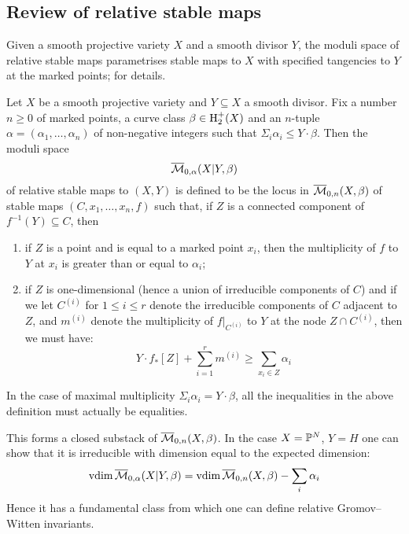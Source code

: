 \subsection{Review of relative stable maps} \label{Subsection relative stable maps} Given a smooth projective variety $X$ and a smooth divisor $Y$, the moduli space of relative stable maps parametrises stable maps to $X$ with specified tangencies to $Y$ at the marked points; \cite{Ga} for details.

\begin{definition} Let $X$ be a smooth projective variety and $Y \subseteq X$ a smooth divisor. Fix a number $n \geq 0$ of marked points, a curve class $\beta \in \operatorname{H}_2^+(X)$ and an $n$-tuple $\alpha = (\alpha_1, \ldots, \alpha_n)$ of non-negative integers such that $\Sigma_i \alpha_i \leq Y \cdot \beta$. Then the moduli space
\begin{equation*} \overline{\mathcal M}_{0,\alpha}(X|Y,\beta) \end{equation*}
of relative stable maps to $(X,Y)$ is defined to be the locus in $\overline{\mathcal M}_{0,n}(X,\beta)$ of stable maps $(C,x_1, \ldots, x_n, f)$ such that, if $Z$ is a connected component of $f^{-1}(Y) \subseteq C$, then
\begin{enumerate}
\item if $Z$ is a point and is equal to a marked point $x_i$, then the multiplicity of $f$ to $Y$ at $x_i$ is greater than or equal to $\alpha_i$;
\item if $Z$ is one-dimensional (hence a union of irreducible components of $C$) and if we let $C^{(i)}$ for $1 \leq i \leq r$ denote the irreducible components of $C$ adjacent to $Z$, and $m^{(i)}$ denote the multiplicity of $f|_{C^{(i)}}$ to $Y$ at the node $Z \cap C^{(i)}$, then we must have:
\begin{equation*} Y \cdot f_* [Z] + \sum_{i=1}^r m^{(i)} \geq \sum_{x_i \in Z} \alpha_i \end{equation*}
\end{enumerate}
\end{definition}
\begin{remark} In the case of maximal multiplicity $\Sigma_{i} \alpha_i = Y \cdot \beta$, all the inequalities in the above definition must actually be equalities. \end{remark}

This forms a closed substack of $\overline{\mathcal M}_{0,n}(X,\beta)$. In the case $X=\mathbb P^N$, $Y=H$ one can show that it is irreducible with dimension equal to the expected dimension:
\begin{equation*} \operatorname{vdim} \overline{\mathcal M}_{0,\alpha}(X|Y,\beta) = \operatorname{vdim}{\overline{\mathcal M}_{0,n}(X,\beta)} - \sum_i \alpha_i \end{equation*}
Hence it has a fundamental class from which one can define relative Gromov--Witten invariants.


